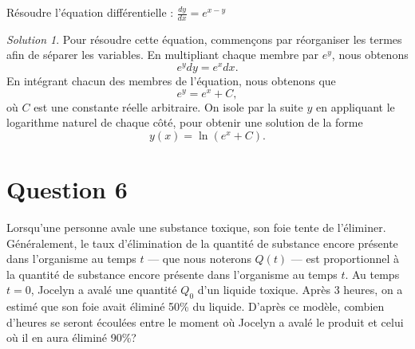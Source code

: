 \documentclass[
  12pt,
  letterpaper,
]{book}
\theoremstyle{remark}
\newtheorem*{solution}{Solution}
\begin{document}
Résoudre l'équation différentielle : \(\frac{dy}{dx} = e^{x-y}\)

\begin{solution}

Pour résoudre cette équation, commençons par réorganiser les termes afin
de séparer les variables. En multipliant chaque membre par \(e^y\), nous
obtenons \[e^y dy = e^x dx.\] En intégrant chacun des membres de
l'équation, nous obtenons que \[e^y = e^x + C,\] où \(C\) est une
constante réelle arbitraire. On isole par la suite \(y\) en appliquant
le logarithme naturel de chaque côté, pour obtenir une solution de la
forme \[y(x) = \ln(e^x + C).\]

\end{solution}

\hypertarget{question-6-4}{%
\section{Question 6}\label{question-6-4}}

Lorsqu'une personne avale une substance toxique, son foie tente de
l'éliminer. Généralement, le taux d'élimination de la quantité de
substance encore présente dans l'organisme au temps \(t\) --- que nous
noterons \(Q(t)\) --- est proportionnel à la quantité de substance
encore présente dans l'organisme au temps \(t\). Au temps \(t=0\),
Jocelyn a avalé une quantité \(Q_0\) d'un liquide toxique. Après 3
heures, on a estimé que son foie avait éliminé 50\% du liquide. D'après
ce modèle, combien d'heures se seront écoulées entre le moment où
Jocelyn a avalé le produit et celui où il en aura éliminé 90\%?
\end{document}
